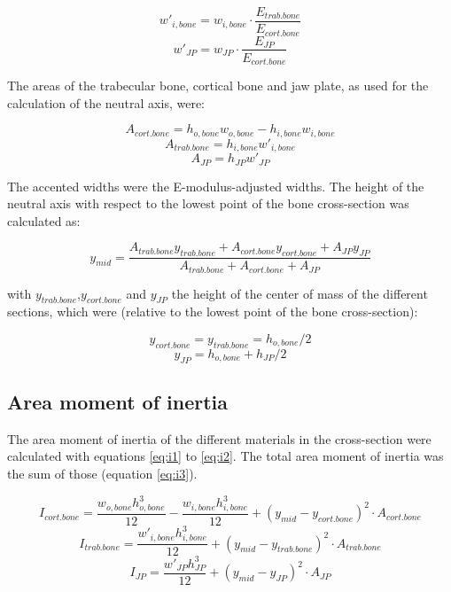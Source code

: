 \begin{subappendices}
\begin{equation}
w'_{i,bone}=w_{i,bone}\cdot \frac{E_{trab.bone}}{E_{cort.bone}}
\end{equation}
\begin{equation}
w'_{JP}=w_{JP}\cdot \frac{E_{JP}}{E_{cort.bone}}
\end{equation}

\noindent The areas of the trabecular bone, cortical bone and jaw plate, as used for the calculation of the neutral axis, were:

\begin{equation}
A_{cort.bone}=h_{o,bone}w_{o,bone}-h_{i,bone}w_{i,bone}
\end{equation}
\begin{equation}
A_{trab.bone}=h_{i,bone}w'_{i,bone}
\end{equation}
\begin{equation}
A_{JP}=h_{JP}w'_{JP}
\end{equation}

\noindent The accented widths were the E-modulus-adjusted widths. The height of the neutral axis with respect to the lowest point of the bone cross-section was calculated as:

\begin{equation}
y_{mid}=\frac{A_{trab.bone}y_{trab.bone}+A_{cort.bone}y_{cort.bone}+A_{JP}y_{JP}}{A_{trab.bone}+A_{cort.bone}+A_{JP}}
\end{equation}

\noindent with $y_{trab.bone}$,$y_{cort.bone}$ and $y_{JP}$ the height of the center of mass of the different sections, which were (relative to the lowest point of the bone cross-section):

\begin{equation}
y_{cort.bone}=y_{trab.bone}=h_{o,bone}/2
\end{equation}
\begin{equation}
y_{JP}=h_{o,bone}+h_{JP}/2
\end{equation}

\subsection{Area moment of inertia}

The area moment of inertia of the different materials in the cross-section were calculated with equations \ref{eq:i1} to \ref{eq:i2}. The total area moment of inertia was the sum of those (equation \ref{eq:i3}).

\begin{equation}
\label{eq:i1}
I_{cort.bone}=\frac{w_{o,bone}h_{o,bone}^3}{12}-\frac{w_{i,bone}h_{i,bone}^3}{12}+(y_{mid}-y_{cort.bone})^2\cdot A_{cort.bone}
\end{equation}
\begin{equation}
I_{trab.bone}=\frac{w'_{i,bone}h_{i,bone}^3}{12}+(y_{mid}-y_{trab.bone})^2\cdot A_{trab.bone}
\end{equation}
\begin{equation}
\label{eq:i2}
I_{JP}=\frac{w'_{JP}h_{JP}^3}{12}+(y_{mid}-y_{JP})^2\cdot A_{JP}
\end{equation}


\end{subappendices}
